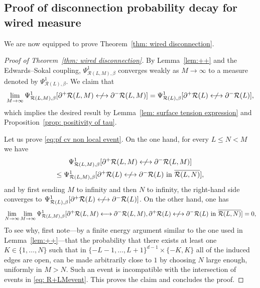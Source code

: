 \documentclass[11pt,a4paper]{article}
\numberwithin{equation}{section}
\theoremstyle{plain}
\theoremstyle{definition}
\begin{document}
\subsection{Proof of disconnection probability decay for wired measure}

We are now equipped to prove Theorem~\ref{thm: wired disconnection}.

\begin{proof}[Proof of Theorem~\textup{\ref{thm: wired disconnection}}]
By Lemma~\ref{lem:++} and the Edwards--Sokal coupling, $\Psi^1_{\mathcal{R}(L,M),\beta}$ converges weakly as $M\to\infty$ to a measure denoted by $\Psi^1_{\mathcal{R}(L),\beta}$. 
We claim that
\begin{equation}\label{eq:pf cv non local event}
\lim_{M\rightarrow \infty} \Psi^1_{\mathcal{R}(L,M),\beta}[\partial^+\mathcal{R}(L,M)\centernot\longleftrightarrow \partial^-\mathcal{R}(L,M)]=\Psi^1_{\mathcal{R}(L),\beta}[\partial^+\mathcal{R}(L)\centernot\longleftrightarrow \partial^-\mathcal{R}(L)],
\end{equation}
which implies the desired result by Lemma~\ref{lem: surface tension expression} and Proposition~\ref{prop: positivity of tau}.

Let us prove \eqref{eq:pf cv non local event}. On the one hand, for every $L\leq N<M$ we have
\begin{multline}
\Psi^1_{\mathcal{R}(L,M),\beta}[\partial^+\mathcal{R}(L,M)\centernot\longleftrightarrow \partial^-\mathcal{R}(L,M)]\\ \leq \Psi^1_{\mathcal{R}(L,M),\beta}[\partial^+\mathcal{R}(L)\centernot\longleftrightarrow \partial^-\mathcal{R}(L) \text{ in } \overline{\mathcal{R}(L,N)}],     
\end{multline}
and by first sending $M$ to infinity and then $N$ to infinity, the right-hand side converges to $\Psi^1_{\mathcal{R}(L),\beta}[\partial^+\mathcal{R}(L)\centernot\longleftrightarrow \partial^-\mathcal{R}(L)]$. On the other hand, one has
\begin{equation} \label{eq: R+LMevent}
\lim_{N\to\infty}\lim_{M\to \infty}\Psi^1_{\mathcal{R}(L,M),\beta}[\partial^+\mathcal{R}(L,M)\longleftrightarrow \partial^-\mathcal{R}(L,M), \partial^+\mathcal{R}(L)\centernot\longleftrightarrow \partial^-\mathcal{R}(L) \text{ in } \overline{\mathcal{R}(L,N)}]=0,
\end{equation} 
To see why, first note---by a finite energy argument similar to the one used in Lemma~\ref{lem:++}---that the probability that there exists at least one $K \in \{1,\ldots,N\}$ such that in $\{-L-1,\dots,L+1\}^{d-1} \times \{-K,K\}$ all of the induced edges are open, can be made arbitrarily close to $1$ by choosing $N$ large enough, uniformly in $M>N$. Such an event is incompatible with the intersection of events in \eqref{eq: R+LMevent}. This proves the claim and concludes the proof.
\end{proof}
\end{document}
